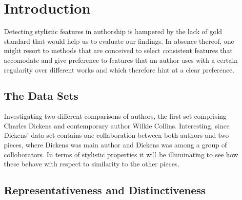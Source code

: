 \documentclass[a4paper,10pt,twoside,fleqn]{article}
\begin{document}
\section{Introduction}

Detecting stylistic features in authorship is hampered by the lack of gold
standard that would help us to evaluate our findings. 
In absence thereof, one might resort to methods that are conceived to select 
consistent features that accomodate and give preference to features that 
an author uses with a certain regularity over different works and which 
therefore hint at a clear preference. 




\subsection{The Data Sets}

Investigating two different comparisons of authors, the first set comprising Charles Dickens and 
contemporary author Wilkie Collins. 
Interesting, since Dickens' data set contains one collaboration between both authors and 
two pieces, where Dickens was main author and Dickens was among a group of colloborators. 
In terms of stylistic properties it will be illuminating to see how these behave 
with respect to similarity to the other pieces. 








\subsection{Representativeness and Distinctiveness}
\end{document}
